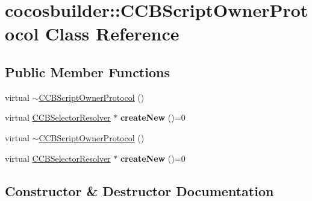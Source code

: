 \hypertarget{classcocosbuilder_1_1CCBScriptOwnerProtocol}{}\section{cocosbuilder\+:\+:C\+C\+B\+Script\+Owner\+Protocol Class Reference}
\label{classcocosbuilder_1_1CCBScriptOwnerProtocol}
\subsection*{Public Member Functions}
\begin{DoxyCompactItemize}
\item 
virtual \hyperlink{classcocosbuilder_1_1CCBScriptOwnerProtocol_aadb1033db4cfc1c89293aeb00144ab08}{$\sim$\+C\+C\+B\+Script\+Owner\+Protocol} ()
\item 
\mbox{\label{classcocosbuilder_1_1CCBScriptOwnerProtocol_a1ecde17a2f2e3ff22f96e9281a2b8606}} 
virtual \hyperlink{classcocosbuilder_1_1CCBSelectorResolver}{C\+C\+B\+Selector\+Resolver} $\ast$ {\bfseries create\+New} ()=0
\item 
virtual \hyperlink{classcocosbuilder_1_1CCBScriptOwnerProtocol_aadb1033db4cfc1c89293aeb00144ab08}{$\sim$\+C\+C\+B\+Script\+Owner\+Protocol} ()
\item 
\mbox{\label{classcocosbuilder_1_1CCBScriptOwnerProtocol_a1ecde17a2f2e3ff22f96e9281a2b8606}} 
virtual \hyperlink{classcocosbuilder_1_1CCBSelectorResolver}{C\+C\+B\+Selector\+Resolver} $\ast$ {\bfseries create\+New} ()=0
\end{DoxyCompactItemize}


\subsection{Constructor \& Destructor Documentation}
\mbox{\label{classcocosbuilder_1_1CCBScriptOwnerProtocol_aadb1033db4cfc1c89293aeb00144ab08}} 
